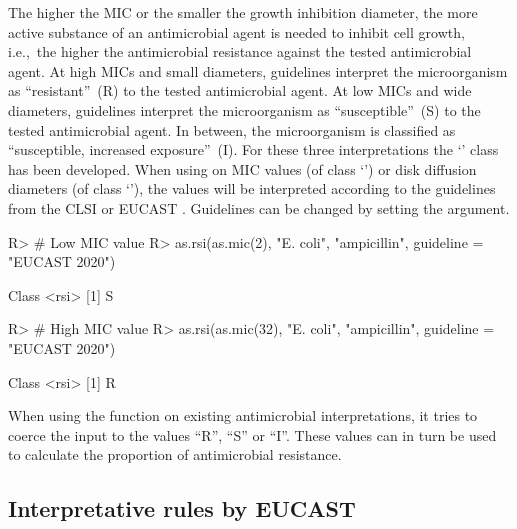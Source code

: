 \documentclass[article, shortnames]{jss}
\newcommand{\class}[1]{`\code{#1}'}
\newcommand{\fct}[1]{\code{#1()}}
\begin{document}
The higher the MIC or the smaller the growth inhibition diameter, the more
active substance of an antimicrobial agent is needed to inhibit cell growth,
i.e.,~the higher the antimicrobial resistance against the tested
antimicrobial agent.  At high MICs and small diameters, guidelines interpret
the microorganism as ``resistant''~(R) to the tested antimicrobial agent. 
At low MICs and wide diameters, guidelines interpret the microorganism as
``susceptible''~(S) to the tested antimicrobial agent.  In between, the
microorganism is classified as ``susceptible, increased exposure''~(I).  For
these three interpretations the \class{rsi} class has been developed.  When
using \fct{as.rsi} on MIC values (of class \class{mic}) or disk diffusion
diameters (of class \class{disk}), the values will be interpreted according
to the guidelines from the CLSI or EUCAST 
\citep[][all guidelines between 2011 and
2020 are included in the  package]{Clinical_and_Laboratory_Standards_Institute2019-tu,
The_European_Committee_on_Antimicrobial_Susceptibility_Testing_undated-hs}. 
Guidelines can be changed by setting the  argument.
%
\begin{CodeChunk}
\begin{CodeInput}
R> # Low MIC value
R> as.rsi(as.mic(2), "E. coli", "ampicillin", guideline = "EUCAST 2020")
\end{CodeInput}
\begin{CodeOutput}
Class <rsi>
[1] S
\end{CodeOutput}
\begin{CodeInput}
R> # High MIC value
R> as.rsi(as.mic(32), "E. coli", "ampicillin", guideline = "EUCAST 2020")
\end{CodeInput}
\begin{CodeOutput}
Class <rsi>
[1] R
\end{CodeOutput}
\end{CodeChunk}
%
When using the \fct{as.rsi} function on existing antimicrobial
interpretations, it tries to coerce the input to the values ``R'', ``S'' or
``I''.  These values can in turn be used to calculate the proportion of
antimicrobial resistance.

\subsection{Interpretative rules by EUCAST}
\end{document}
